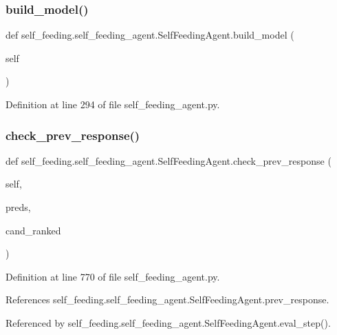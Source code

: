 \subsubsection{\texorpdfstring{build\+\_\+model()}{build\_model()}}
{\footnotesize\ttfamily def self\+\_\+feeding.\+self\+\_\+feeding\+\_\+agent.\+Self\+Feeding\+Agent.\+build\+\_\+model (\begin{DoxyParamCaption}\item[{}]{self }\end{DoxyParamCaption})}



Definition at line 294 of file self\+\_\+feeding\+\_\+agent.\+py.

\mbox{\label{classself__feeding_1_1self__feeding__agent_1_1SelfFeedingAgent_a7dc80f7fcb8270b3fb87ddff8848750d}} 
\subsubsection{\texorpdfstring{check\+\_\+prev\+\_\+response()}{check\_prev\_response()}}
{\footnotesize\ttfamily def self\+\_\+feeding.\+self\+\_\+feeding\+\_\+agent.\+Self\+Feeding\+Agent.\+check\+\_\+prev\+\_\+response (\begin{DoxyParamCaption}\item[{}]{self,  }\item[{}]{preds,  }\item[{}]{cand\+\_\+ranked }\end{DoxyParamCaption})}



Definition at line 770 of file self\+\_\+feeding\+\_\+agent.\+py.



References self\+\_\+feeding.\+self\+\_\+feeding\+\_\+agent.\+Self\+Feeding\+Agent.\+prev\+\_\+response.



Referenced by self\+\_\+feeding.\+self\+\_\+feeding\+\_\+agent.\+Self\+Feeding\+Agent.\+eval\+\_\+step().

